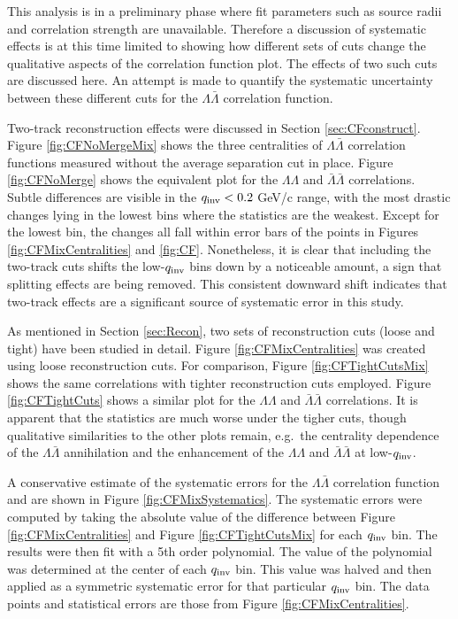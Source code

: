 This analysis is in a preliminary phase where fit parameters such as source radii and correlation strength are unavailable.  Therefore a discussion of systematic effects is at this time limited to showing how different sets of cuts change the qualitative aspects of the correlation function plot.  The effects of two such cuts are discussed here.  An attempt is made to quantify the systematic uncertainty between these different cuts for the $\Lambda\bar{\Lambda}$ correlation function.

Two-track reconstruction effects were discussed in Section \ref{sec:CFconstruct}. Figure \ref{fig:CFNoMergeMix} shows the three centralities of $\Lambda\bar{\Lambda}$ correlation functions measured without the average separation cut in place.  Figure \ref{fig:CFNoMerge} shows the equivalent plot for the $\Lambda\Lambda$ and $\bar{\Lambda}\bar{\Lambda}$ correlations. Subtle differences are visible in the $q_{\rm inv} < 0.2$ GeV/c range, with the most drastic changes lying in the lowest bins where the statistics are the weakest.  Except for the lowest bin, the changes all fall within error bars of the points in Figures \ref{fig:CFMixCentralities} and \ref{fig:CF}.  Nonetheless, it is clear that including the two-track cuts  shifts the low-$q_{\rm inv}$ bins down by a noticeable amount, a sign that splitting effects are being removed.  This consistent downward shift indicates that two-track effects are a significant source of systematic error in this study.

As mentioned in Section \ref{sec:Recon}, two sets of reconstruction cuts (loose and tight) have been studied in detail.  Figure \ref{fig:CFMixCentralities} was created using loose reconstruction cuts.  For comparison, Figure \ref{fig:CFTightCutsMix} shows the same correlations with tighter reconstruction cuts employed.  Figure \ref{fig:CFTightCuts} shows a similar plot for the $\Lambda\Lambda$ and $\bar{\Lambda}\bar{\Lambda}$ correlations.  It is apparent that the statistics are much worse under the tigher cuts, though qualitative similarities to the other plots remain, e.g.\ the centrality dependence of the $\Lambda\bar{\Lambda}$ annihilation and the enhancement of the $\Lambda\Lambda$ and $\bar{\Lambda}\bar{\Lambda}$ at low-$q_{\rm inv}$.

A conservative estimate of the systematic errors for the $\Lambda\bar{\Lambda}$ correlation function and are shown in Figure \ref{fig:CFMixSystematics}.  The systematic errors were computed by taking the absolute value of the difference between Figure \ref{fig:CFMixCentralities} and Figure \ref{fig:CFTightCutsMix} for each $q_{\rm inv}$ bin.  The results were then fit with a 5th order polynomial.  The value of the polynomial was determined at the center of each $q_{\rm inv}$ bin.  This value was halved and then applied as a symmetric systematic error for that particular $q_{\rm inv}$ bin.  The data points and statistical errors are those from Figure \ref{fig:CFMixCentralities}.





